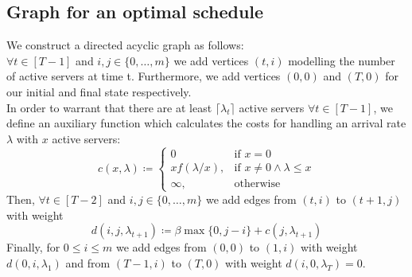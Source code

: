 \documentclass[hidelinks]{article}
\theoremstyle{plain}
\theoremstyle{definition}
\theoremstyle{rem}
\begin{document}
\begin{sloppypar}
\subsection{Graph for an optimal schedule}\label{sec:optgraph}
We construct a directed acyclic graph as follows:\\
$\forall t\in[T-1]$ and $i,j\in\{0,\ldots,m\}$ we add vertices $(t,i)$ modelling the number of active servers at time t. Furthermore, we add vertices $(0,0)$ and $(T,0)$ for our initial and final state respectively.\\
In order to warrant that there are at least $\lceil\lambda_t\rceil$ active servers $\forall t\in[T-1]$, we define an auxiliary function which calculates the costs for handling an arrival rate $\lambda$ with $x$ active servers:
\begin{equation}
	c(x,\lambda)\coloneqq\begin{cases}
          0 & \text{if $x=0$}\\
	  xf(\lambda/x), & \text{if $x\ne 0\wedge\lambda\le x$}\\
	  \infty, & \text{otherwise}
	  \end{cases} \label{fct:c}
\end{equation}
Then, $\forall t\in[T-2]$ and $i,j\in\{0,\ldots,m\}$ we add edges from $(t,i)$ to $(t+1,j)$ with weight
\begin{equation}
	d(i,j,\lambda_{t+1})\coloneqq\beta\max\{0,j-i\}+c(j,\lambda_{t+1})
\end{equation}
Finally, for $0\le i\le m$ we add edges from $(0,0)$ to $(1,i)$ with weight $d(0,i,\lambda_1)$ and from $(T-1,i)$ to $(T,0)$ with weight $d(i,0,\lambda_T)=0$.
\begin{figure}[H]
\centering
{}
\end{figure}
\end{sloppypar}
\end{document}

